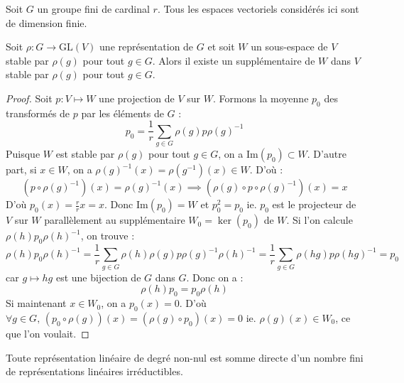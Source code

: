





	Soit $G$ un groupe fini de cardinal $r$. Tous les espaces vectoriels considérés ici sont de dimension finie.

	\medskip

	\begin{lemma}
		\label{theoreme-de-maschke-1}
		Soit $\rho : G \rightarrow \mathrm{GL}(V)$ une représentation de $G$ et soit $W$ un sous-espace de $V$ stable par $\rho(g)$ pour tout $g \in G$. Alors il existe un supplémentaire de $W$ dans $V$ stable par $\rho(g)$ pour tout $g \in G$.
	\end{lemma}

	\begin{proof}
		Soit $p : V \mapsto W$ une projection de $V$ sur $W$. Formons la moyenne $p_0$ des transformés de $p$ par les éléments de $G$ :
		\[ p_0 = \frac{1}{r} \sum_{g \in G} \rho(g) p \rho(g)^{-1} \]
		Puisque $W$ est stable par $\rho(g)$ pour tout $g \in G$, on a $\mathrm{Im}(p_0) \subset W$.
		\newpar
		D'autre part, si $x \in W$, on a $\rho(g)^{-1}(x) = \rho(g^{-1})(x) \in W$. D'où :
		\[ (p \circ \rho(g)^{-1})(x) = \rho(g)^{-1}(x) \implies (\rho(g) \circ p \circ \rho(g)^{-1})(x) = x \]
		D'où $p_0(x) = \frac{r}{r} x = x$. Donc $\mathrm{Im}(p_0) = W$ et $p_0^2 = p_0$ ie. $p_0$ est le projecteur de $V$ sur $W$ parallèlement au supplémentaire $W_0 = \ker(p_0)$ de $W$.
		\newpar
		Si l'on calcule $\rho(h) p_0 \rho(h)^{-1}$, on trouve :
		\[ \rho(h) p_0 \rho(h)^{-1} = \frac{1}{r} \sum_{g \in G} \rho(h) \rho(g) p \rho(g)^{-1} \rho(h)^{-1} = \frac{1}{r} \sum_{g \in G} \rho(hg) p \rho(hg)^{-1} = p_0 \]
		car $g \mapsto hg$ est une bijection de $G$ dans $G$. Donc on a :
		\[ \rho(h) p_0 = p_0 \rho(h) \]
		Si maintenant $x \in W_0$, on a $p_0(x) = 0$. D'où $\forall g \in G, \, (p_0 \circ \rho(g))(x) = (\rho(g) \circ p_0)(x) = 0$ ie. $\rho(g)(x) \in W_0$, ce que l'on voulait.
	\end{proof}

	\begin{theorem}[Maschke]
		Toute représentation linéaire de degré non-nul est somme directe d'un nombre fini de représentations linéaires irréductibles.
	\end{theorem}

